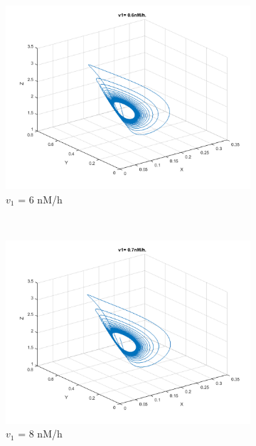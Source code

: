 \documentclass[10pt,a4paper,oneside,twocolumn]{article}
\numberwithin{equation}{section} %
\begin{document}
\begin{figure}
\begin{subfigure}[b]{0.32\textwidth}
	    \includegraphics[width=\textwidth]{LotsofthesameA/A-AA6.png}
	    \caption{$v_1$ = 6 nM/h}
	\end{subfigure}
	~ 
	\begin{subfigure}[b]{0.32\textwidth}
	    \includegraphics[width=\textwidth]{LotsofthesameA/A-AA7.png}
	    \caption{$v_1$ = 8 nM/h}
	\end{subfigure}
	~
	\begin{subfigure}[b]{0.32\textwidth}

\end{subfigure}
\end{figure}
\end{document}
